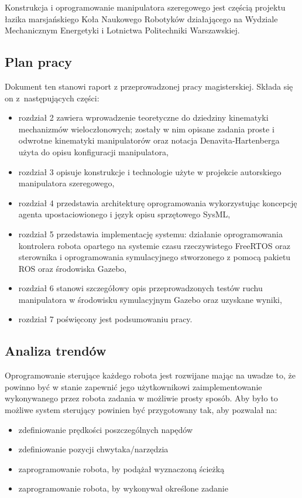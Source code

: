 \documentclass[a4paper, 12pt, twoside]{article}
\begin{document}
Konstrukcja i oprogramowanie manipulatora szeregowego jest częścią projektu łazika marsjańskiego Koła Naukowego Robotyków działającego na Wydziale Mechanicznym Energetyki i Lotnictwa Politechniki Warszawskiej.

\subsection{Plan pracy}

Dokument ten stanowi raport z przeprowadzonej pracy magisterskiej. Składa się on z~następujących części:
\begin{itemize}
\item rozdział 2 zawiera wprowadzenie teoretyczne do dziedziny kinematyki mechanizmów wieloczłonowych; zostały w nim opisane zadania proste i odwrotne kinematyki manipulatorów oraz notacja Denavita-Hartenberga użyta do opisu konfiguracji manipulatora,
\item rozdział 3 opisuje konstrukcje i technologie użyte w projekcie autorskiego manipulatora szeregowego,
\item rozdział 4 przedstawia architekturę oprogramowania wykorzystując koncepcję agenta upostaciowionego i język opisu sprzętowego SysML,
\item rozdział 5 przedstawia implementację systemu: działanie oprogramowania kontrolera robota opartego na systemie czasu rzeczywistego FreeRTOS oraz sterownika i oprogramowania symulacyjnego stworzonego z pomocą pakietu ROS oraz środowiska Gazebo,
\item rozdział 6 stanowi szczegółowy opis przeprowadzonych testów ruchu manipulatora w środowisku symulacyjnym Gazebo oraz uzyskane wyniki,
\item rozdział 7 poświęcony jest podsumowaniu pracy.  
\end{itemize} 

\subsection{Analiza trendów}

Oprogramowanie sterujące każdego robota jest rozwijane mając na uwadze to, że powinno być w stanie zapewnić jego użytkownikowi zaimplementowanie wykonywanego przez robota zadania w możliwie prosty sposób. Aby było to możliwe system sterujący powinien być przygotowany tak, aby pozwalał na:

\begin{itemize}
\item zdefiniowanie prędkości poszczególnych napędów
\item zdefiniowanie pozycji chwytaka/narzędzia
\item zaprogramowanie robota, by podążał wyznaczoną ścieżką
\item zaprogramowanie robota, by wykonywał określone zadanie
\end{itemize}
\end{document}
